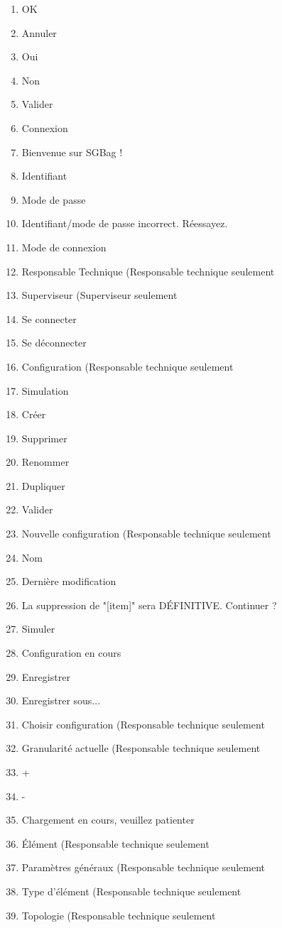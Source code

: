 \newcommand\urt{(Responsable technique seulement}
\newcommand\us{(Superviseur seulement}
\begin{enumerate}
	\item OK
	\item Annuler
	\item Oui
	\item Non
	\item Valider
	\item Connexion
	\item Bienvenue sur SGBag !
	\item Identifiant
	\item Mode de passe
	\item Identifiant/mode de passe incorrect. Réessayez.
	\item Mode de connexion
	\item Responsable Technique \urt
	\item Superviseur \us
	\item Se connecter
	\item Se déconnecter
	\item Configuration \urt
	\item Simulation
	\item Créer
	\item Supprimer
	\item Renommer
	\item Dupliquer
	\item Valider
	\item Nouvelle configuration \urt
	\item Nom
	\item Dernière modification
	\item La suppression de "[item]" sera DÉFINITIVE. Continuer ?
	\item Simuler
	\item Configuration en cours
	\item Enregistrer
	\item Enregistrer sous...
	\item Choisir configuration \urt
	\item Granularité actuelle \urt
	\item +
	\item -
	\item Chargement en cours, veuillez patienter
	\item Élément \urt
	\item Paramètres généraux \urt
	\item Type d'élément \urt
	\item Topologie \urt

\end{enumerate}
